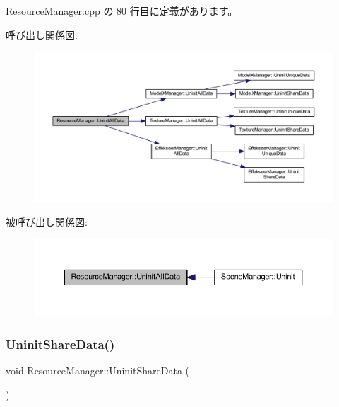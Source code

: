  Resource\+Manager.\+cpp の 80 行目に定義があります。

呼び出し関係図\+:
\nopagebreak
\begin{figure}[H]
\begin{center}
\leavevmode
\includegraphics[width=350pt]{class_resource_manager_a8d96f0a74a92212e8b2948467bb3cac7_cgraph}
\end{center}
\end{figure}
被呼び出し関係図\+:
\nopagebreak
\begin{figure}[H]
\begin{center}
\leavevmode
\includegraphics[width=350pt]{class_resource_manager_a8d96f0a74a92212e8b2948467bb3cac7_icgraph}
\end{center}
\end{figure}
\mbox{\label{class_resource_manager_a786915d9c4df5a023a43db8c5332cb93}} 
\subsubsection{\texorpdfstring{Uninit\+Share\+Data()}{UninitShareData()}}
{\footnotesize\ttfamily void Resource\+Manager\+::\+Uninit\+Share\+Data (\begin{DoxyParamCaption}{ }\end{DoxyParamCaption})\hspace{0.3cm}{\ttfamily [static]}}



